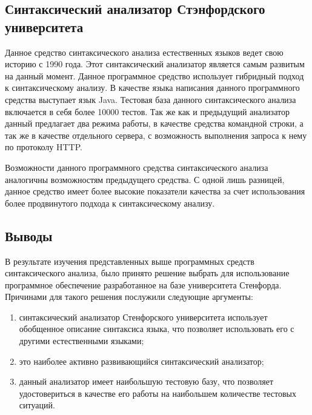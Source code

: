 \documentclass{standalone}
\begin{document}
\subsection{Синтаксический анализатор Стэнфордского университета}

\par Данное средство синтаксического анализа естественных языков ведет свою историю с 1990 года. Этот синтаксический анализатор является самым развитым на данный момент. Данное программное средство использует гибридный подход к синтаксическому анализу. В качестве языка написания данного программного средства выступает язык Java. Тестовая база данного синтаксического анализа включается в себя более 10000 тестов. Так же как и предыдущий анализатор данный предлагает два режима работы, в качестве средства командной строки, а так же в качестве отдельного сервера, с возможность выполнения запроса к нему по протоколу HTTP.
\par Возможности данного программного средства синтаксического анализа аналогичны возможностям предыдущего средства. С одной лишь разницей, данное средство имеет более высокие показатели качества за счет использования более продвинутого подхода к синтаксическому анализу.

\subsection{Выводы}

\par В результате изучения представленных выше программных средств синтаксического анализа, было принято решение выбрать для использование программное обеспечение разработанное на базе университета Стенфорда. Причинами для такого решения послужили следующие аргументы:
\begin{enumerate}
    \item синтаксический анализатор Стенфорского университета использует обобщенное описание синтаксиса языка, что позволяет использовать его с другими естественными языками;
    \item это наиболее активно развивающийся синтаксический анализатор;
    \item данный анализатор имеет наибольшую тестовую базу, что позволяет удостовериться в качестве его работы на наибольшем количестве тестовых ситуаций.
\end{enumerate}
\end{document}
